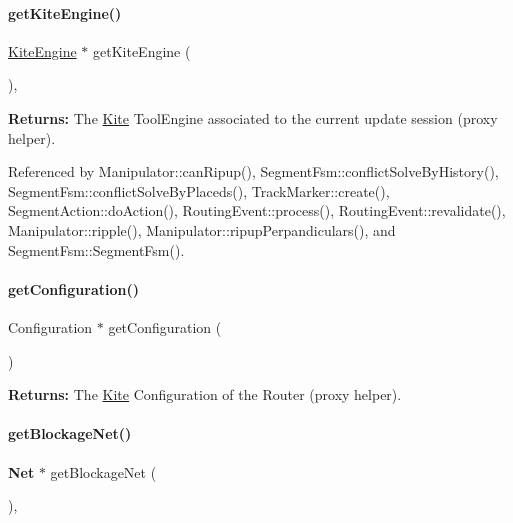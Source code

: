 \paragraph{\texorpdfstring{get\+Kite\+Engine()}{getKiteEngine()}}
{\footnotesize\ttfamily \hyperlink{classKite_1_1KiteEngine}{Kite\+Engine} $\ast$ get\+Kite\+Engine (\begin{DoxyParamCaption}{ }\end{DoxyParamCaption})\hspace{0.3cm}{\ttfamily [inline]}, {\ttfamily [static]}}

{\bfseries Returns\+:} The \hyperlink{namespaceKite}{Kite} Tool\+Engine associated to the current update session (proxy helper). 

Referenced by Manipulator\+::can\+Ripup(), Segment\+Fsm\+::conflict\+Solve\+By\+History(), Segment\+Fsm\+::conflict\+Solve\+By\+Placeds(), Track\+Marker\+::create(), Segment\+Action\+::do\+Action(), Routing\+Event\+::process(), Routing\+Event\+::revalidate(), Manipulator\+::ripple(), Manipulator\+::ripup\+Perpandiculars(), and Segment\+Fsm\+::\+Segment\+Fsm().

\mbox{\label{classKite_1_1Session_a9a7fbadfe526875680f698c76adfb128}} 
\paragraph{\texorpdfstring{get\+Configuration()}{getConfiguration()}}
{\footnotesize\ttfamily Configuration $\ast$ get\+Configuration (\begin{DoxyParamCaption}{ }\end{DoxyParamCaption})\hspace{0.3cm}{\ttfamily [static]}}

{\bfseries Returns\+:} The \hyperlink{namespaceKite}{Kite} Configuration of the Router (proxy helper). \mbox{\label{classKite_1_1Session_aef6f41b0e8265ad574d1797f46ab9fa8}} 
\paragraph{\texorpdfstring{get\+Blockage\+Net()}{getBlockageNet()}}
{\footnotesize\ttfamily \textbf{ Net} $\ast$ get\+Blockage\+Net (\begin{DoxyParamCaption}{ }\end{DoxyParamCaption})\hspace{0.3cm}{\ttfamily [inline]}, {\ttfamily [static]}}

